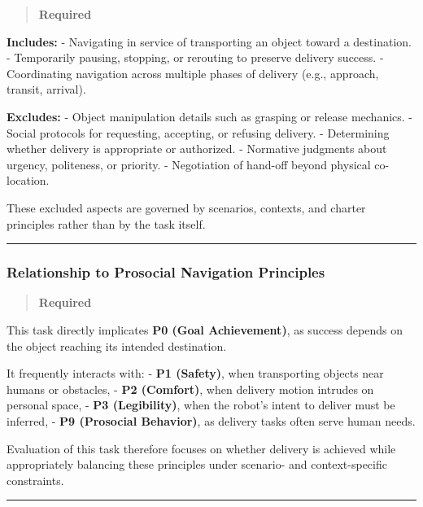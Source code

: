 \documentclass[utf8]{frontiers_suppmat} %
\begin{document}
\begin{quote}
\textbf{Required}
\end{quote}

\textbf{Includes:} - Navigating in service of transporting an object
toward a destination. - Temporarily pausing, stopping, or rerouting to
preserve delivery success. - Coordinating navigation across multiple
phases of delivery (e.g., approach, transit, arrival).

\textbf{Excludes:} - Object manipulation details such as grasping or
release mechanics. - Social protocols for requesting, accepting, or
refusing delivery. - Determining whether delivery is appropriate or
authorized. - Normative judgments about urgency, politeness, or
priority. - Negotiation of hand-off beyond physical co-location.

These excluded aspects are governed by scenarios, contexts, and charter
principles rather than by the task itself.

\begin{center}\rule{0.5\linewidth}{0.5pt}\end{center}

\subsubsection{Relationship to Prosocial Navigation
Principles}\label{relationship-to-prosocial-navigation-principles}

\begin{quote}
\textbf{Required}
\end{quote}

This task directly implicates \textbf{P0 (Goal Achievement)}, as success
depends on the object reaching its intended destination.

It frequently interacts with: - \textbf{P1 (Safety)}, when transporting
objects near humans or obstacles, - \textbf{P2 (Comfort)}, when delivery
motion intrudes on personal space, - \textbf{P3 (Legibility)}, when the
robot's intent to deliver must be inferred, - \textbf{P9 (Prosocial
Behavior)}, as delivery tasks often serve human needs.

Evaluation of this task therefore focuses on whether delivery is
achieved while appropriately balancing these principles under scenario-
and context-specific constraints.

\begin{center}\rule{0.5\linewidth}{0.5pt}\end{center}
\end{document}
